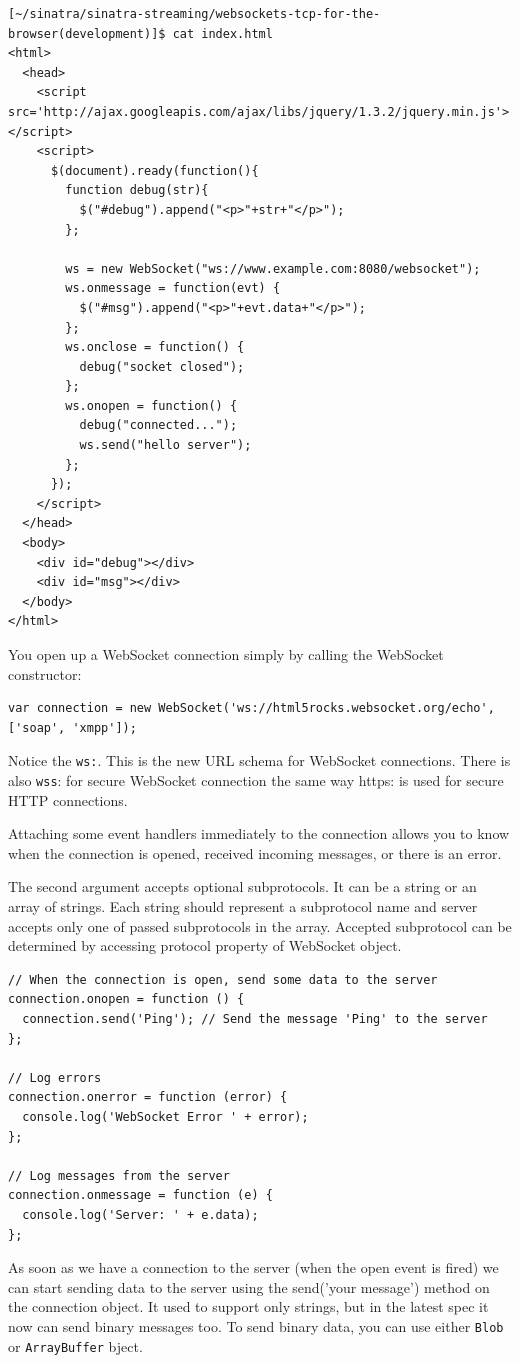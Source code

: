 \begin{verbatim}
[~/sinatra/sinatra-streaming/websockets-tcp-for-the-browser(development)]$ cat index.html 
<html>
  <head>
    <script src='http://ajax.googleapis.com/ajax/libs/jquery/1.3.2/jquery.min.js'></script>
    <script>
      $(document).ready(function(){
        function debug(str){ 
          $("#debug").append("<p>"+str+"</p>"); 
        };

        ws = new WebSocket("ws://www.example.com:8080/websocket");
        ws.onmessage = function(evt) { 
          $("#msg").append("<p>"+evt.data+"</p>"); 
        };
        ws.onclose = function() { 
          debug("socket closed"); 
        };
        ws.onopen = function() {
          debug("connected...");
          ws.send("hello server");
        };
      });
    </script>
  </head>
  <body>
    <div id="debug"></div>
    <div id="msg"></div>
  </body>
</html>
\end{verbatim}
You open up a WebSocket connection simply by calling the WebSocket constructor:

\begin{verbatim}
var connection = new WebSocket('ws://html5rocks.websocket.org/echo', ['soap', 'xmpp']);
\end{verbatim}
Notice the \verb|ws:|. This is the new URL schema for WebSocket connections.
There is also \verb|wss|: for secure WebSocket connection the same way
https: is used for secure HTTP connections.

Attaching some event handlers immediately to the connection allows
you to know when the connection is opened, received incoming messages,
or there is an error.

The second argument accepts optional subprotocols. It can be a
string or an array of strings. Each string should represent a
subprotocol name and server accepts only one of passed subprotocols
in the array. Accepted subprotocol can be determined by accessing
protocol property of WebSocket object.

\begin{verbatim}
// When the connection is open, send some data to the server
connection.onopen = function () {
  connection.send('Ping'); // Send the message 'Ping' to the server
};

// Log errors
connection.onerror = function (error) {
  console.log('WebSocket Error ' + error);
};

// Log messages from the server
connection.onmessage = function (e) {
  console.log('Server: ' + e.data);
};
\end{verbatim}
As soon as we have a connection to the server (when the open event
is fired) we can start sending data to the server using the send('your
message') method on the connection object. It used to support only
strings, but in the latest spec it now can send binary messages
too. To send binary data, you can use either \verb|Blob| or \verb|ArrayBuffer|
bject.

